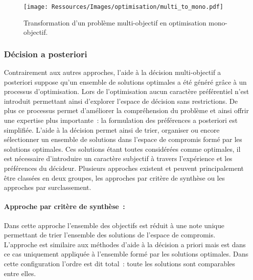 \begin{figure}
    \begin{center}
        \texttt{[image: Ressources/Images/optimisation/multi\_to\_mono.pdf]}
    \end{center}
    \caption{Transformation d’un problème multi-objectif en optimisation mono-objectif.
             \label{fig:multi_to_mono}}
\end{figure}


\subsubsection{Décision a posteriori} %
\label{ssub:decision_a_posteriori}
Contrairement aux autres approches, l’aide à la décision multi-objectif a posteriori
suppose qu’un ensemble de solutions optimales a été généré grâce à un processus
d’optimisation. Lors de l’optimisation aucun caractère préférentiel
n’est introduit permettant ainsi d’explorer l’espace de décision sans restrictions.
De plus ce processus permet d’améliorer la compréhension du problème et ainsi
offrir une expertise plus importante~: la formulation des préférences a posteriori
est simplifiée.
L’aide à la décision permet ainsi de trier, organiser ou encore sélectionner un
ensemble de solutions dans l’espace de compromis formé par les solutions optimales.
Ces solutions étant toutes considérées comme optimales, il est nécessaire d’introduire
un caractère subjectif à travers l’expérience et les préférences du décideur.
Plusieurs approches existent et peuvent principalement être classées en deux groupes,
les approches par critère de synthèse ou les approches par surclassement.


\paragraph{Approche par critère de synthèse~:} %
\label{par:approche_par_critère_de_synthèse}
Dans cette approche l’ensemble des objectifs est réduit à une note unique permettant
de trier l’ensemble des solutions de l’espace de compromis.
L’approche est similaire aux méthodes d’aide à la décision a priori mais est dans
ce cas uniquement appliquée à l’ensemble formé par les solutions optimales. Dans cette
configuration l’ordre est dit total~: toute les solutions sont comparables entre elles.

